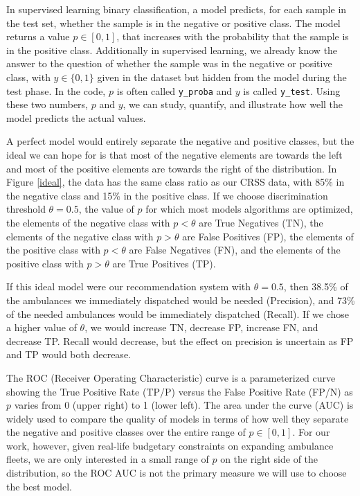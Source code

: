 In supervised learning binary classification, a model predicts, for each sample in the test set, whether the sample is in the negative or positive class.  The model returns a value $p \in [0,1]$, that increases with the probability that the sample is in the positive class.  Additionally in supervised learning, we already know the answer to the question of whether the sample was in the negative or positive class, with $y \in \{0,1\}$ given in the dataset but hidden from the model during the test phase.  In the code, $p$ is often called \verb|y_proba| and $y$ is called \verb|y_test|.  Using these two numbers, $p$ and $y$, we can study, quantify, and illustrate how well the model predicts the actual values.  

A perfect model would entirely separate the negative and positive classes, but the ideal we can hope for is that most of the negative elements are towards the left and most of the positive elements are towards the right of the distribution.  In Figure \ref{ideal}, the data has the same class ratio as our CRSS data, with 85\% in the negative class and 15\% in the positive class.  If we choose discrimination threshold $\theta = 0.5$, the value of $p$ for which most models algorithms are optimized, the elements of the negative class with $p<\theta$ are True Negatives (TN), the elements of the negative class with $p > \theta$ are False Positives (FP), the elements of the positive class with $p < \theta$ are False Negatives (FN), and the elements of the positive class with $p > \theta$ are True Positives (TP).  

If this ideal model were our recommendation system with $\theta = 0.5$, then 38.5\% of the ambulances we immediately dispatched would be needed (Precision), and 73\% of the needed ambulances would be immediately dispatched (Recall).  If we chose a higher value of $\theta$, we would increase TN, decrease FP, increase FN, and decrease TP.  Recall would decrease, but the effect on precision is uncertain as FP and TP would both decrease.

The ROC (Receiver Operating Characteristic) curve is a parameterized curve showing the True Positive Rate (TP/P) versus the False Positive Rate (FP/N) as $p$ varies from 0 (upper right) to 1 (lower left).  The area under the curve (AUC) is widely used to compare the quality of models in terms of how well they separate the negative and positive classes over the entire range of $p \in [0,1]$.  For our work, however, given real-life budgetary constraints on expanding ambulance fleets, we are only interested in a small range of $p$ on the right side of the distribution, so the ROC AUC is not the primary measure we will use to choose the best model.

